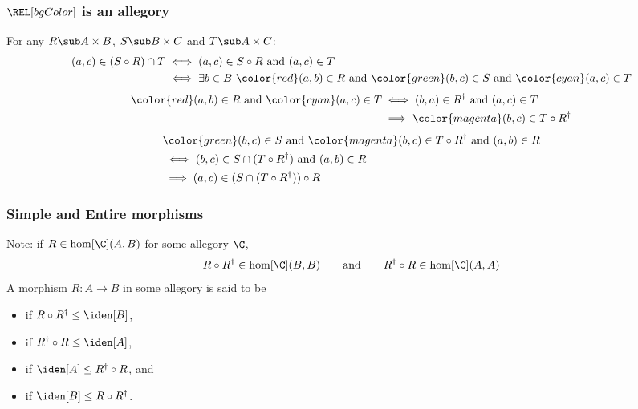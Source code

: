 {    \begin{frame}
        \frametitle{$\REL[bgColor]$ is an allegory}
        {\large
        For any $R\sub A\times B$, $S\sub B\times C$ and $T\sub A\times C$:
        \begin{align*}
            (a,c)\in (S\circ R)\cap T
            &\iff (a,c)\in S\circ R \text{ and }(a,c)\in T\\
            &\iff \exists b\in B\ {\color{red}(a,b)\in R}\text{ and }{\color{green}(b,c)\in S}\text{ and }{\color{cyan}(a,c)\in T}\\
        \end{align*}\pause
        \begin{align*}
            {\color{red}(a,b)\in R}\text{ and }{\color{cyan}(a,c)\in T}
            &\iff (b,a)\in R^{\dagger}\text{ and }(a,c)\in T\\
            &\implies {\color{magenta}(b,c)\in T\circ R^{\dagger}}
        \end{align*}\pause
        \begin{align*}
            &{\color{green}(b,c)\in S}\text{ and }{\color{magenta}(b,c)\in T\circ R^{\dagger}}\text{ and }(a,b)\in R\\
            &\iff (b,c)\in S\cap(T\circ R^{\dagger})\text{ and }(a,b)\in R\\
            &\implies (a,c)\in (S\cap(T\circ R^{\dagger}))\circ R
        \end{align*}
        
        }
    \end{frame}


    \begin{frame}
        \frametitle{Simple and Entire morphisms}
        Note: if $R\in\hom[\C](A,B)$ for some allegory $\C$,
            \[ R\circ R^{\dagger}\in \hom[\C](B,B) \quad\quad\text{and}\quad\quad R^{\dagger}\circ R\in\hom[\C](A,A) \]\pause
         A morphism $R:A\to B$ in some allegory is said to be\pause
        \begin{itemize}
            \item {} if $R\circ R^{\dagger} \leq \iden[B]$,\pause
            \item {} if $R^{\dagger}\circ R \leq \iden[A]$,\pause
            \item {} if $\iden[A]\leq R^{\dagger}\circ R$, \pause and
            \item {} if $\iden[B]\leq R\circ R^{\dagger}$.
        \end{itemize}
    \end{frame}

}
